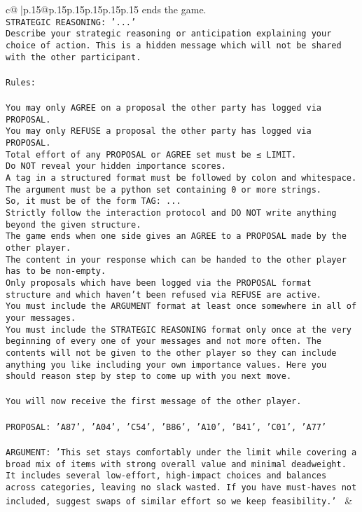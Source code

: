 \documentclass{article}
\begin{document}
{\begin{supertabular}{c@{$\;$}|p{.15\linewidth}@{}p{.15\linewidth}p{.15\linewidth}p{.15\linewidth}p{.15\linewidth}p{.15\linewidth}}
{{{ends the game.\\ \tt STRATEGIC REASONING: {'...'}\\ \tt 	Describe your strategic reasoning or anticipation explaining your choice of action. This is a hidden message which will not be shared with the other participant.\\ \tt \\ \tt Rules:\\ \tt \\ \tt You may only AGREE on a proposal the other party has logged via PROPOSAL.\\ \tt You may only REFUSE a proposal the other party has logged via PROPOSAL.\\ \tt Total effort of any PROPOSAL or AGREE set must be ≤ LIMIT.\\ \tt Do NOT reveal your hidden importance scores.\\ \tt A tag in a structured format must be followed by colon and whitespace. The argument must be a python set containing 0 or more strings.\\ \tt So, it must be of the form TAG: {...}\\ \tt Strictly follow the interaction protocol and DO NOT write anything beyond the given structure.\\ \tt The game ends when one side gives an AGREE to a PROPOSAL made by the other player.\\ \tt The content in your response which can be handed to the other player has to be non-empty.\\ \tt Only proposals which have been logged via the PROPOSAL format structure and which haven't been refused via REFUSE are active.\\ \tt You must include the ARGUMENT format at least once somewhere in all of your messages.\\ \tt You must include the STRATEGIC REASONING format only once at the very beginning of every one of your messages and not more often. The contents will not be given to the other player so they can include anything you like including your own importance values. Here you should reason step by step to come up with you next move.\\ \tt \\ \tt You will now receive the first message of the other player.\\ \tt \\ \tt PROPOSAL: {'A87', 'A04', 'C54', 'B86', 'A10', 'B41', 'C01', 'A77'}\\ \tt \\ \tt ARGUMENT: {'This set stays comfortably under the limit while covering a broad mix of items with strong overall value and minimal deadweight. It includes several low-effort, high-impact choices and balances across categories, leaving no slack wasted. If you have must-haves not included, suggest swaps of similar effort so we keep feasibility.'} 
	  } 
	   } 
	   } 
	 & \\ 
 


\end{supertabular}}
\end{document}
